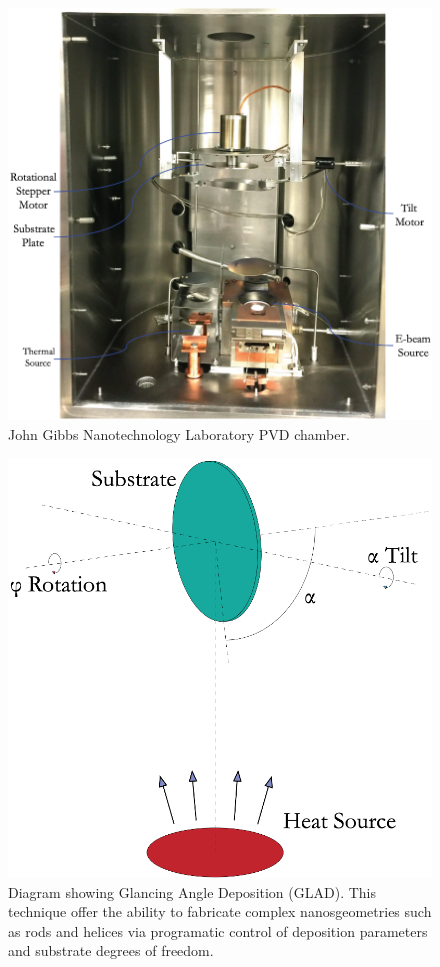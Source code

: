 \begin{figure}[t]
  \centering
  \includegraphics[width=\textwidth]{figs/4-Raman/DepositionChamber.png}
  \caption{John Gibbs Nanotechnology Laboratory \ac{PVD} chamber.}
  \label{fig:Raman:DepositionChamber}
\end{figure}

\begin{figure}[t]
  \centering
  \includegraphics[width=\textwidth]{figs/4-Raman/GLAD.png}
  \caption{Diagram showing Glancing Angle Deposition (\acs{GLAD}). This technique offer the ability to fabricate complex nanosgeometries such as rods and helices via programatic control of deposition parameters and substrate degrees of freedom.}
  \label{fig:Raman:GLAD}
\end{figure}

